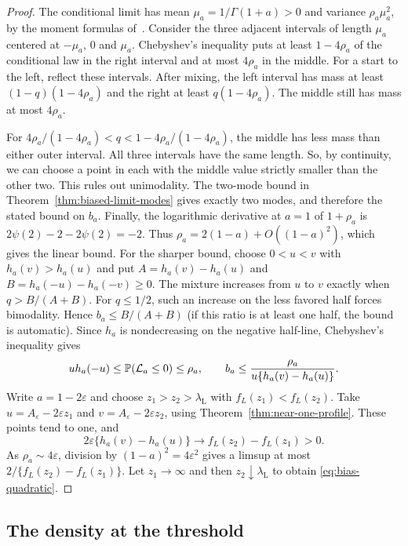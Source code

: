 \begin{proof}
The conditional limit has mean $\mu_a=1/\Gamma(1+a)>0$ and variance
$\rho_a\mu_a^2$, by the moment formulas of~\cite[Theorem~1.4]{glr2026}.
Consider the three adjacent intervals of length $\mu_a$ centered at
$-\mu_a$, $0$ and $\mu_a$. Chebyshev's inequality puts at least
$1-4\rho_a$ of the conditional law in the right interval and at most
$4\rho_a$ in the middle. For a start to the left, reflect these
intervals. After mixing, the left interval has mass at least
$(1-q)(1-4\rho_a)$ and the right at least $q(1-4\rho_a)$.
The middle still has mass at most $4\rho_a$.

For $4\rho_a/(1-4\rho_a)<q<1-4\rho_a/(1-4\rho_a)$, the middle
has less mass than either outer interval. All three intervals have
the same length. So, by continuity, we can choose a point in each
with the middle value strictly smaller than the other two.
This rules out unimodality. The two-mode bound in
Theorem~\ref{thm:biased-limit-modes} gives exactly two modes, and
therefore the stated bound on $b_a$. Finally, the logarithmic derivative at $a=1$
of $1+\rho_a$ is $2\psi(2)-2-2\psi(2)=-2$.
Thus $\rho_a=2(1-a)+O((1-a)^2)$, which gives the linear bound.
For the sharper bound, choose $0<u<v$ with $h_a(v)>h_a(u)$ and put
$A=h_a(v)-h_a(u)$ and $B=h_a(-u)-h_a(-v)\ge0$.
The mixture increases from $u$ to $v$ exactly when $q>B/(A+B)$.
For $q\le1/2$, such an increase on the less favored half forces
bimodality. Hence $b_a\le B/(A+B)$ (if this ratio is at least one half,
the bound is automatic). Since $h_a$ is nondecreasing on the negative
half-line, Chebyshev's inequality gives
\[
 u h_a(-u)\le\mathbb{P}(\mathcal L_a\le0)\le\rho_a,
 \qquad b_a\le\frac{\rho_a}{u\{h_a(v)-h_a(u)\}}.
\]
Write $a=1-2\varepsilon$ and choose $z_1>z_2>\lambda_{\mathrm L}$
with $f_L(z_1)<f_L(z_2)$.
Take $u=A_\varepsilon-2\varepsilon z_1$ and
$v=A_\varepsilon-2\varepsilon z_2$, using
Theorem~\ref{thm:near-one-profile}. These points tend to one, and
\[
 2\varepsilon\{h_a(v)-h_a(u)\}
 \longrightarrow f_L(z_2)-f_L(z_1)>0.
\]
As $\rho_a\sim4\varepsilon$, division by $(1-a)^2=4\varepsilon^2$
gives a limsup at most $2/\{f_L(z_2)-f_L(z_1)\}$.
Let $z_1\to\infty$ and then $z_2\downarrow\lambda_{\mathrm L}$
to obtain \eqref{eq:bias-quadratic}.
\end{proof}

\subsection{The density at the threshold}

